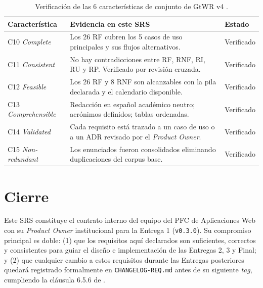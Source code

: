 \documentclass[11pt,a4paper,twoside]{report}
\begin{document}
\begin{table}[htbp]
    \centering
    \small
    \caption{Verificaci\'on de las 6 caracter\'isticas de conjunto de GtWR v4 \cite{incose2023requirements}.}
    \label{tab:completitud}
    \begin{tabularx}{\textwidth}{@{}lXl@{}}
        \toprule
        \textbf{Caracter\'istica} & \textbf{Evidencia en este SRS} & \textbf{Estado} \\
        \midrule
        C10 \emph{Complete}          & Los 26 RF cubren los 5 casos de uso principales y sus flujos alternativos. & Verificado \\
        C11 \emph{Consistent}        & No hay contradicciones entre RF, RNF, RI, RU y RP. Verificado por revisi\'on cruzada. & Verificado \\
        C12 \emph{Feasible}          & Los 26 RF y 8 RNF son alcanzables con la pila declarada y el calendario disponible. & Verificado \\
        C13 \emph{Comprehensible}    & Redacci\'on en espa\~nol acad\'emico neutro; acr\'onimos definidos; tablas ordenadas. & Verificado \\
        C14 \emph{Validated}         & Cada requisito est\'a trazado a un caso de uso o a un ADR revisado por el \emph{Product Owner}. & Verificado \\
        C15 \emph{Non-redundant}     & Los enunciados fueron consolidados eliminando duplicaciones del corpus base. & Verificado \\
        \bottomrule
    \end{tabularx}
\end{table}

\chapter*{Cierre}

Este SRS constituye el contrato interno del equipo del PFC de Aplicaciones Web con su \emph{Product Owner} institucional para la Entrega 1 (\texttt{v0.3.0}). Su compromiso principal es doble: (1) que los requisitos aqu\'i declarados son suficientes, correctos y consistentes para guiar el dise\~no e implementaci\'on de las Entregas 2, 3 y Final; y (2) que cualquier cambio a estos requisitos durante las Entregas posteriores quedar\'a registrado formalmente en \texttt{CHANGELOG-REQ.md} antes de su siguiente \emph{tag}, cumpliendo la cl\'ausula 6.5.6 de \cite{iso29148}.
\end{document}
